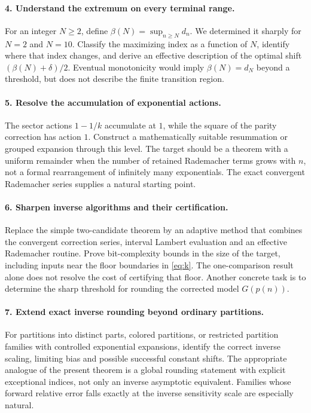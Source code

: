 \documentclass[11pt]{article}
\numberwithin{equation}{section}
\theoremstyle{definition}
\theoremstyle{remark}
\begin{document}
\paragraph{4. Understand the extremum on every terminal range.}
For an integer $N\ge2$, define
$\beta(N)=\sup_{n\ge N}d_n$. We determined it sharply for $N=2$ and
$N=10$. Classify the maximizing index as a function of $N$, identify
where that index changes, and derive an effective description of the
optimal shift $(\beta(N)+\delta)/2$. Eventual monotonicity would imply
$\beta(N)=d_N$ beyond a threshold, but does not describe the finite
transition region.

\paragraph{5. Resolve the accumulation of exponential actions.}
The sector actions $1-1/k$ accumulate at $1$, while the square of the
parity correction has action $1$. Construct a mathematically suitable
resummation or grouped expansion through this level. The target should
be a theorem with a uniform remainder when the number of retained
Rademacher terms grows with $n$, not a formal rearrangement of infinitely
many exponentials. The exact convergent Rademacher series supplies a
natural starting point.

\paragraph{6. Sharpen inverse algorithms and their certification.}
Replace the simple two-candidate theorem by an adaptive method that
combines the convergent correction series, interval Lambert evaluation
and an effective Rademacher routine. Prove bit-complexity bounds in the
size of the target, including inputs near the floor boundaries in
\eqref{eq:k}. The one-comparison result alone does not resolve the
cost of certifying that floor. Another concrete task is to determine
the sharp threshold for rounding the corrected model $G(p(n))$.

\paragraph{7. Extend exact inverse rounding beyond ordinary partitions.}
For partitions into distinct parts, colored partitions, or restricted
partition families with controlled exponential expansions, identify the
correct inverse scaling, limiting bias and possible successful constant
shifts. The appropriate analogue of the present theorem is a global
rounding statement with explicit exceptional indices, not only an
inverse asymptotic equivalent. Families whose forward relative error
falls exactly at the inverse sensitivity scale are especially natural.
\end{document}
